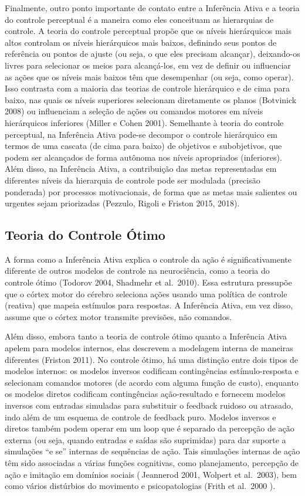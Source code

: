 \documentclass[
  12pt,
]{book}
\begin{document}
Finalmente, outro ponto importante de contato entre a Inferência Ativa e a teoria do controle perceptual é a maneira como eles conceituam as hierarquias de controle. A teoria do controle perceptual propõe que os níveis hierárquicos mais altos controlam os níveis hierárquicos mais baixos, definindo seus pontos de referência ou pontos de ajuste (ou seja, o que eles precisam alcançar), deixando-os livres para selecionar os meios para alcançá-los, em vez de definir ou influenciar as ações que os níveis mais baixos têm que desempenhar (ou seja, como operar). Isso contrasta com a maioria das teorias de controle hierárquico e de cima para baixo, nas quais os níveis superiores selecionam diretamente os planos (Botvinick 2008) ou influenciam a seleção de ações ou comandos motores em níveis hierárquicos inferiores (Miller e Cohen 2001). Semelhante à teoria do controle perceptual, na Inferência Ativa pode-se decompor o controle hierárquico em termos de uma cascata (de cima para baixo) de objetivos e subobjetivos, que podem ser alcançados de forma autônoma nos níveis apropriados (inferiores). Além disso, na Inferência Ativa, a contribuição das metas representadas em diferentes níveis da hierarquia de controle pode ser modulada (precisão ponderada) por processos motivacionais, de forma que as metas mais salientes ou urgentes sejam priorizadas (Pezzulo, Rigoli e Friston 2015, 2018).

\hypertarget{teoria-do-controle-uxf3timo}{%
\subsection{Teoria do Controle Ótimo}\label{teoria-do-controle-uxf3timo}}

A forma como a Inferência Ativa explica o controle da ação é significativamente diferente de outros modelos de controle na neurociência, como a teoria do controle ótimo (Todorov 2004, Shadmehr et al.~2010). Essa estrutura pressupõe que o córtex motor do cérebro seleciona ações usando uma política de controle (reativa) que mapeia estímulos para respostas. A Inferência Ativa, em vez disso, assume que o córtex motor transmite previsões, não comandos.

Além disso, embora tanto a teoria de controle ótimo quanto a Inferência Ativa apelem para modelos internos, elas descrevem a modelagem interna de maneiras diferentes (Friston 2011). No controle ótimo, há uma distinção entre dois tipos de modelos internos: os modelos inversos codificam contingências estímulo-resposta e selecionam comandos motores (de acordo com alguma função de custo), enquanto os modelos diretos codificam contingências ação-resultado e fornecem modelos inversos com entradas simuladas para substituir o feedback ruidoso ou atrasado, indo além de um esquema de controle de feedback puro. Modelos inversos e diretos também podem operar em um loop que é separado da percepção de ação externa (ou seja, quando entradas e saídas são suprimidas) para dar suporte a simulações ``e se'' internas de sequências de ação. Tais simulações internas de ação têm sido associadas a várias funções cognitivas, como planejamento, percepção de ação e imitação em domínios sociais ( Jeannerod 2001, Wolpert et al.~2003), bem como vários distúrbios do movimento e psicopatologias (Frith et al.~2000 ).
\end{document}
